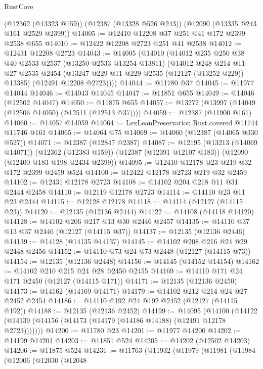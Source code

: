 \begin{lexlean}{RustCore}
\begin{coremodule}
    (@12362 (@13323 @159))
    (@12387 (@13328 @526 @243))
    (@12090 (@13335 @243 @161 @2529 @2399))
@14005 := @12410 @12208 @37 @251 @41 @172 @2399 @2538 @655
@14010 := @12422 @12208 @2723 @251 @41 @2538
@14012 := @12431 @12208 @2723
@14043 := @14005
    (@14010
      (@14012
        @235
        @250
        @38
        @40
        @2533
        @2537
        (@13250 @2533 @13254 @13811)
        (@14012
          @248
          @214
          @11
          @27
          @2535
          @2454
          (@13247 @229 @11 @229 @2535 (@12127 (@13252 @229)) @13385)
          (@12491 @12208 @2723))))
@14044 := @11780 @37
@14045 := @11977 @14044
@14046 := @14043 @14045
@14047 := @11851 @655
@14049 := @14046 (@12502 @14047)
@14050 := @11875 @655
@14057 := @13272 (@13997 (@14049 (@12506 @14050) (@12511 (@12513 @37))))
@14059 := @12387 (@11900 @161)
@14060 := @14057 @14059
@14064 := LexLeanPreservation.Rust.covered @11744 @11746 @161
@14065 := @14064 @75
@14069 := @14060 (@12387 (@14065 @330 @527))
@14071 := @12387 (@12847 @2387)
@14087 := @12195
    (@13213 (@14069 @14071))
    (@12362 (@12383 @159))
    (@12387 (@12391 @12107 @183))
    (@12090 (@12400 @183 @198 @2434 @2399))
@14095 := @12410 @12178 @23 @219 @32 @172 @2399 @2459 @524
@14100 := @12422 @12178 @2723 @219 @32 @2459
@14102 := @12431 @12178 @2723
@14108 := @14102 @204 @218 @11 @31 @2444 @2458
@14110 := @12119 @12178 @2723
@14114 := @14110 @23 @11 @23 @2444
@14115 := @12128 @12178
@14118 := @14114 (@12127 (@14115 @23))
@14120 := @12135 (@12136 @2444)
@14122 := @14108 (@14118 @14120)
@14128 := @14102 @206 @217 @13 @30 @2446 @2457
@14135 := @14110 @37 @13 @37 @2446 (@12127 (@14115 @37))
@14137 := @12135 (@12136 @2446)
@14139 := @14128 (@14135 @14137)
@14145 := @14102 @208 @216 @24 @29 @2448 @2456
@14152 := @14110 @73 @24 @73 @2448 (@12127 (@14115 @73))
@14154 := @12135 (@12136 @2448)
@14156 := @14145 (@14152 @14154)
@14162 := @14102 @210 @215 @24 @28 @2450 @2455
@14169 := @14110 @171 @24 @171 @2450 (@12127 (@14115 @171))
@14171 := @12135 (@12136 @2450)
@14173 := @14162 (@14169 @14171)
@14179 := @14102 @212 @214 @24 @27 @2452 @2454
@14186 := @14110 @192 @24 @192 @2452 (@12127 (@14115 @192))
@14188 := @12135 (@12136 @2452)
@14199 := @14095
    (@14100 (@14122 (@14139 (@14156 (@14173 (@14179 (@14186 @14188) (@12491 @12178 @2723)))))))
@14200 := @11780 @23
@14201 := @11977 @14200
@14202 := @14199 @14201
@14203 := @11851 @524
@14205 := @14202 (@12502 @14203)
@14206 := @11875 @524
@14231 := @11763
    (@11932
      (@11979
        (@11981
          (@11984
            (@12006
              (@12030
                (@12048

\end{coremodule}
\end{lexlean}
